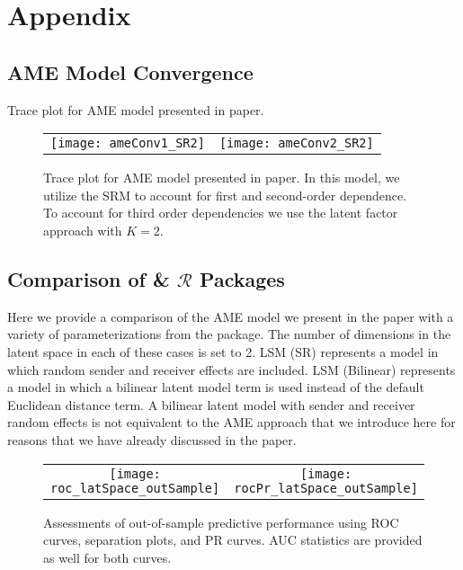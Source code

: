 \clearpage

\renewcommand{\thefigure}{A\arabic{figure}}
\setcounter{figure}{0}
\renewcommand{\thetable}{A.\arabic{table}}
\setcounter{table}{0}
\renewcommand{\thesection}{A.\arabic{section}}
\setcounter{section}{0}

\section{\textbf{Appendix}}

\subsection{AME Model Convergence}
\label{sec:ameConvAppendix}

Trace plot for AME model presented in paper.  

\begin{figure}[ht]
	\centering
	\begin{tabular}{cc}
	\texttt{[image: ameConv1\_SR2]} &
	\texttt{[image: ameConv2\_SR2]}
	\end{tabular}
	\caption{Trace plot for AME model presented in paper. In this model, we utilize the SRM to account for first and second-order dependence. To account for third order dependencies we use the latent factor approach with $K=2$.}
	\label{fig:ameConv}
\end{figure}
\FloatBarrier
\newpage

\subsection{Comparison of  \&  $\mathcal{R}$ Packages}
\label{sec:ameVsLatentnetAppendix}

Here we provide a comparison of the AME model we present in the paper with a variety of parameterizations from the  package. The number of dimensions in the latent space in each of these cases is set to 2. LSM (SR) represents a model in which random sender and receiver effects are included. LSM (Bilinear) represents a model in which a bilinear latent model term is used instead of the default Euclidean distance term. A bilinear latent model with sender and receiver random effects is not equivalent to the AME approach that we introduce here for reasons that we have already discussed in the paper. 



\begin{figure}[ht]
	\centering
	\begin{tabular}{cc}
	\texttt{[image: roc\_latSpace\_outSample]} & 
	\texttt{[image: rocPr\_latSpace\_outSample]}
	\end{tabular}
	\caption{Assessments of out-of-sample predictive performance using ROC curves, separation plots, and PR curves. AUC statistics are provided as well for both curves.}
	\label{fig:roc_latentSpace}
\end{figure}

